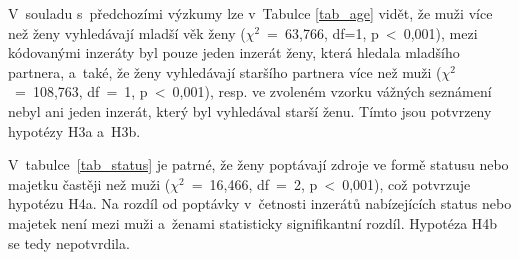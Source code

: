 \documentclass[a4paper, 12pt, notitlepage, oneside, numbers=noenddot]{report}
\begin{document}

V~souladu s~předchozími výzkumy \citep{WayfordDunbar1995} lze
v~Tabulce \ref{tab_age} vidět, že muži více než ženy vyhledávají
mladší věk ženy ($\chi^2 $~=~63,766, df=1, p~{\textless}~0,001), mezi
kódovanými inzeráty byl pouze jeden inzerát ženy, která hledala
mladšího partnera, a~také, že ženy vyhledávají staršího partnera více
než muži ($\chi^2 $~=~108,763, df~=~1, p~{\textless}~0,001), resp. ve
zvoleném vzorku vážných seznámení nebyl ani jeden inzerát, který byl
vyhledával starší ženu. Tímto jsou potvrzeny hypotézy H3a a~H3b.


V~tabulce~\ref{tab_status} je patrné, že ženy poptávají zdroje ve
formě statusu nebo majetku častěji než muži ($\chi^2$~=~16,466, df~=~2,
p~{\textless}~0,001), což potvrzuje hypotézu H4a.  Na rozdíl od
poptávky v~četnosti inzerátů nabízejících status nebo majetek není
mezi muži a~ženami statisticky signifikantní rozdíl. Hypotéza H4b se
tedy nepotvrdila.
\end{document}
